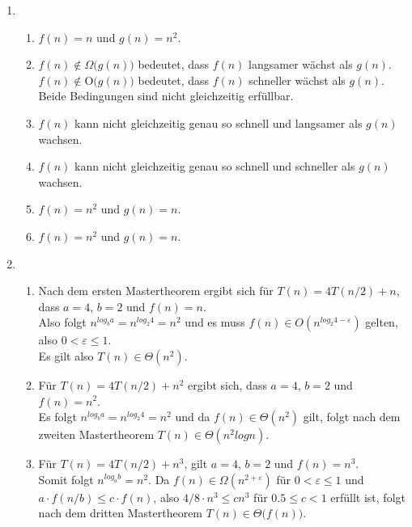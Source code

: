 \documentclass[a4paper,11pt]{article}             %
\begin{document}

\begin{enumerate}

\item
\begin{enumerate}

\item
$f(n)=n$ und $g(n)=n^2$.

\item
$f(n)\notin\Omega\big(g(n)\big)$ bedeutet, dass $f(n)$ langsamer wächst als $g(n)$.
$f(n)\notin\mathrm{O}\big(g(n)\big)$ bedeutet, dass $f(n)$ schneller wächst als $g(n)$.
Beide Bedingungen sind nicht gleichzeitig erfüllbar.

\item
$f(n)$ kann nicht gleichzeitig genau so schnell und langsamer als $g(n)$ wachsen.

\item
$f(n)$ kann nicht gleichzeitig genau so schnell und schneller als $g(n)$ wachsen.

\item
$f(n)=n^2$ und $g(n)=n$.

\item
$f(n)=n^2$ und $g(n)=n$.

\end{enumerate}

\item
\begin{enumerate}

\item
Nach dem ersten Mastertheorem ergibt sich für $T(n)=4 T(n/2) + n$, dass $a=4$, $b=2$ und $f(n)=n$.\\
Also folgt $n^{log_b a} = n^{log_2 4} = n^2$ und es muss $f(n) \in O(n^{log_2 4-\varepsilon})$ gelten, also $0 < \varepsilon \leq 1$.\\
Es gilt also $T(n)\in \Theta(n^2)$.

\item
Für $T(n)=4 T(n/2) + n^2$ ergibt sich, dass $a=4$, $b=2$ und $f(n)=n^2$.\\
Es folgt $n^{log_b a} = n^{log_2 4} = n^2$ und da $f(n) \in \Theta(n^2)$ gilt, folgt nach dem zweiten Mastertheorem $T(n) \in \Theta(n^2 log n)$.

\item
Für $T(n) = 4 T(n/2) + n^3$, gilt $a=4$, $b=2$ und $f(n)=n^3$.\\
Somit folgt $n^{log_a b} = n^2$. Da $f(n) \in \Omega(n^{2 + \varepsilon})$ für $0 < \varepsilon \leq 1$ und $a \cdot f(n/b) \leq c \cdot f(n)$, also $4/8 \cdot n^3 \leq c n^3$ für $0.5 \leq c < 1$ erfüllt ist, folgt nach dem dritten Mastertheorem $T(n) \in \Theta\big(f(n)\big)$.


\end{enumerate}
\end{enumerate}
\end{document}
